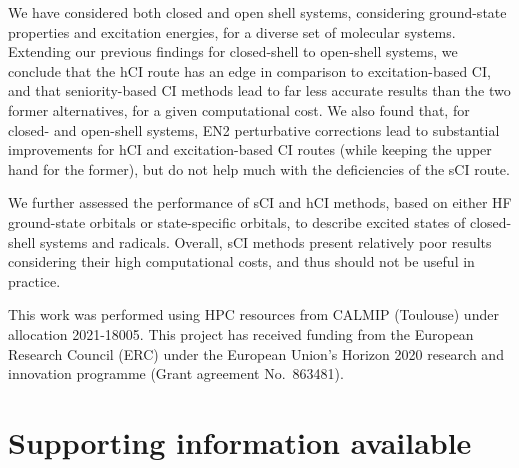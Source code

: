 \documentclass[aip,jcp,reprint,noshowkeys,superscriptaddress]{revtex4-1}
\begin{document}

We have considered both closed and open shell systems, considering ground-state properties and excitation energies, for a diverse set of molecular systems.
Extending our previous findings for closed-shell \cite{Kossoski_2022} to open-shell systems,
we conclude that the hCI route has an edge in comparison to excitation-based CI,
and that seniority-based CI methods lead to far less accurate results than the two former alternatives, for a given computational cost.
We also found that, for closed- and open-shell systems,
EN2 perturbative corrections lead to substantial improvements for hCI and excitation-based CI routes (while keeping the upper hand for the former), but do not help much with the deficiencies of the sCI route.


We further assessed the performance of sCI and hCI methods, based on either HF ground-state orbitals or state-specific orbitals, to describe excited states of closed-shell systems and radicals.
Overall, sCI methods present relatively poor results considering their high computational costs, and thus should not be useful in practice.



\begin{acknowledgements}
This work was performed using HPC resources from CALMIP (Toulouse) under allocation 2021-18005.
This project has received funding from the European Research Council (ERC) under the European Union's Horizon 2020 research and innovation programme (Grant agreement No.~863481).
\end{acknowledgements}

\section*{Supporting information available}
\label{sec:SI}



\end{document}
